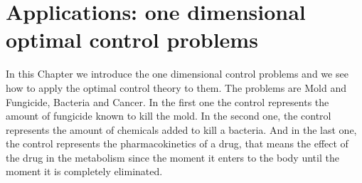 %
\chapter{Applications: one dimensional optimal control problems} 
    
    In this Chapter we introduce the one dimensional control problems and we 
    see how to apply the optimal control theory to them. The problems are Mold 
    and Fungicide, Bacteria and Cancer. In the first one the control represents 
    the amount of fungicide known to kill the mold. In the second one, the 
    control represents the amount of chemicals added to kill a bacteria. And in 
    the last one, the control represents the pharmacokinetics of a drug, that
    means the effect of the drug in the metabolism since the moment it enters 
    to the body until the moment it is completely eliminated. 
    


%

\newpage